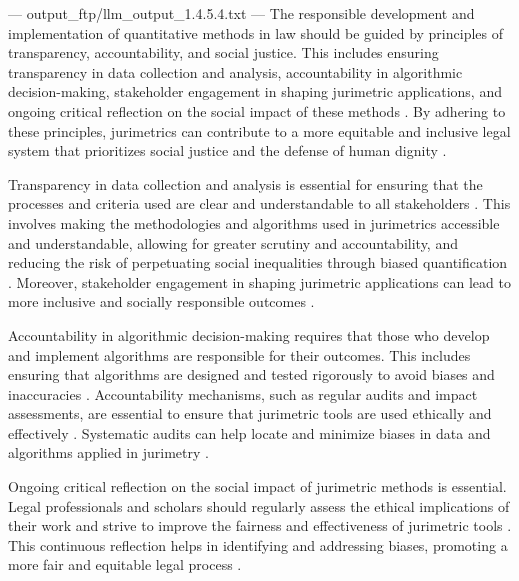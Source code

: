 ---
output_ftp/llm_output_1.4.5.4.txt
---
The responsible development and implementation of quantitative methods in law should be guided by principles of transparency, accountability, and social justice. This includes ensuring transparency in data collection and analysis, accountability in algorithmic decision-making, stakeholder engagement in shaping jurimetric applications, and ongoing critical reflection on the social impact of these methods \cite{10.1590/data.2022.65.3.267,loevinger1959}. By adhering to these principles, jurimetrics can contribute to a more equitable and inclusive legal system that prioritizes social justice and the defense of human dignity \cite{10.1590/data.2022.65.3.267,loevinger1959}.

Transparency in data collection and analysis is essential for ensuring that the processes and criteria used are clear and understandable to all stakeholders \cite{10.1590/data.2022.65.3.267,10.1057/s41599-020-00557-0}. This involves making the methodologies and algorithms used in jurimetrics accessible and understandable, allowing for greater scrutiny and accountability, and reducing the risk of perpetuating social inequalities through biased quantification \cite{10.1590/data.2022.65.3.267,10.1057/s41599-020-0396-5}. Moreover, stakeholder engagement in shaping jurimetric applications can lead to more inclusive and socially responsible outcomes \cite{10.1590/data.2022.65.3.267,10.1057/s41599-020-0396-5}.

Accountability in algorithmic decision-making requires that those who develop and implement algorithms are responsible for their outcomes. This includes ensuring that algorithms are designed and tested rigorously to avoid biases and inaccuracies \cite{10.1007/s11186-021-09453-1,loevinger1959}. Accountability mechanisms, such as regular audits and impact assessments, are essential to ensure that jurimetric tools are used ethically and effectively \cite{10.1007/s11186-021-09453-1,loevinger1959}. Systematic audits can help locate and minimize biases in data and algorithms applied in jurimetry \cite{10.1590/data.2022.65.3.267,inthelawviewmetadatacitationsimilarpapers2014}.

Ongoing critical reflection on the social impact of jurimetric methods is essential. Legal professionals and scholars should regularly assess the ethical implications of their work and strive to improve the fairness and effectiveness of jurimetric tools \cite{unger2021process}. This continuous reflection helps in identifying and addressing biases, promoting a more fair and equitable legal process \cite{10.1007/s11186-021-09453-1,loevinger1959}.

